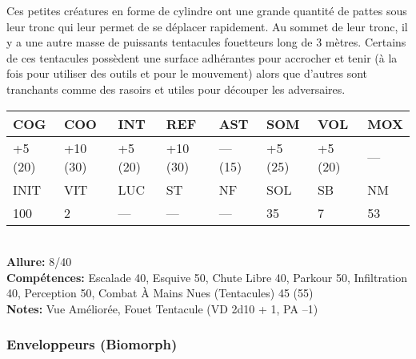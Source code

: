 Ces petites créatures en forme de cylindre ont une grande quantité de pattes sous leur tronc qui leur permet de se déplacer rapidement. Au sommet de leur tronc, il y a une autre masse de puissants tentacules fouetteurs long de 3 mètres. Certains de ces tentacules possèdent une surface adhérantes pour accrocher et tenir (à la fois pour utiliser des outils et pour le mouvement) alors que d'autres sont tranchants comme des rasoirs et utiles pour découper les adversaires. \\ \begin{tabular}{|l|l|l|l|l|l|l|l|} \hline

COG &COO &INT &REF &AST &SOM &VOL &MOX \\ \hline

+5 (20) &+10 (30) &+5 (20) &+10 (30) &— (15) &+5 (25) &+5 (20) &— \\ \hline

INIT &VIT &LUC &ST &NF &SOL &SB &NM \\ \hline

100 &2 &— &— &— &35 &7 &53 \\ \hline

\end{tabular} \\ \textbf{Allure:} 8/40 \\ \textbf{Compétences:} Escalade 40, Esquive 50, Chute Libre 40, Parkour 50, Infiltration 40, Perception 50, Combat À Mains Nues (Tentacules) 45 (55) \\ \textbf{Notes: }Vue Améliorée, Fouet Tentacule (VD 2d10 + 1, PA –1) 

\subsubsection{Enveloppeurs (Biomorph)} 

